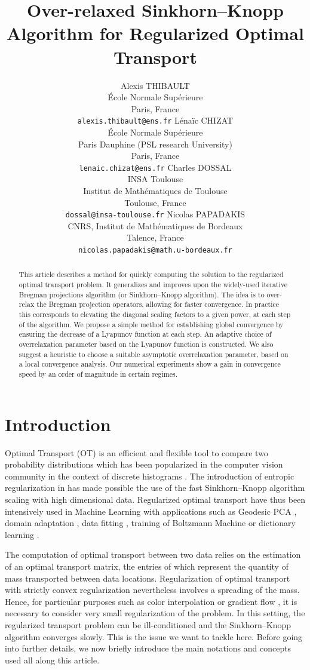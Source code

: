 \documentclass{article} %
\title{Over-relaxed Sinkhorn--Knopp Algorithm for Regularized Optimal Transport}
\author{
Alexis THIBAULT\\
\'Ecole Normale Sup\'erieure\\
Paris, France\\
\texttt{alexis.thibault@ens.fr}
 \And
L\'ena\"ic CHIZAT\\
\'Ecole Normale Sup\'erieure\\ Paris Dauphine (PSL research University)\\
Paris, France\\
\texttt{lenaic.chizat@ens.fr}
 \AND
Charles DOSSAL\\
INSA Toulouse\\
Institut de Math\'ematiques de Toulouse\\
Toulouse,  France\\
\texttt{dossal@insa-toulouse.fr}
\And 
Nicolas PAPADAKIS\\
CNRS, Institut de Math\'ematiques de Bordeaux\\
Talence, France\\
\texttt{nicolas.papadakis@math.u-bordeaux.fr}
}
\theoremstyle{plain}
\theoremstyle{definition}
\theoremstyle{remark}
\begin{document}
\maketitle

\begin{abstract}
This article describes a method for quickly computing the solution to the regularized optimal transport problem. It generalizes and improves upon the widely-used iterative Bregman projections algorithm (or Sinkhorn--Knopp algorithm). 
The idea is to over-relax the Bregman projection operators, allowing for faster convergence. In practice this corresponds to elevating the diagonal scaling factors to a given power, at each step of the algorithm.
We propose a simple method for establishing global convergence by ensuring the decrease of a Lyapunov function at each step.
An adaptive choice of overrelaxation parameter based on the Lyapunov function is constructed.
We also suggest a heuristic to choose a suitable asymptotic overrelaxation parameter, based on a local convergence analysis. Our numerical experiments show a gain in convergence speed by an order of magnitude in certain regimes.
\end{abstract}

\section{Introduction}
Optimal Transport (OT) is an efficient and flexible tool to compare two probability distributions which has been popularized in the computer vision community in the context of discrete histograms \cite{Rubner2000}. The introduction of entropic regularization in \cite{cuturi13} has made possible the use of the fast Sinkhorn--Knopp algorithm \cite{sinkhorn64}   scaling with high dimensional data. 
Regularized optimal transport have thus been intensively used  in  Machine Learning with applications such as   Geodesic PCA \cite{seguy2015principal}, domain adaptation \cite{2015arXiv150700504C}, data fitting \cite{2015arXiv150605439F},  training of Boltzmann Machine \cite{NIPS2016_6248}  or dictionary learning \cite{Rolet2016,2017arXiv170801955S}.

The computation of optimal transport between two data relies on the estimation of an optimal transport matrix, the entries of which represent the quantity of mass transported between  data locations. 
Regularization of optimal transport with strictly convex regularization \cite{cuturi13, dessein2016}  nevertheless involves a spreading of the mass. Hence, for particular purposes such as color interpolation \cite{Rabin2014} or gradient flow \cite{2016arXiv160705816C}, it is  necessary  to consider very small regularization of the problem.
In this setting,  the regularized transport problem can be ill-conditioned and the Sinkhorn--Knopp algorithm converges slowly. This is the issue  we want to tackle here.
Before going into further details, we now briefly introduce the main notations and concepts used all along this article.
\end{document}
